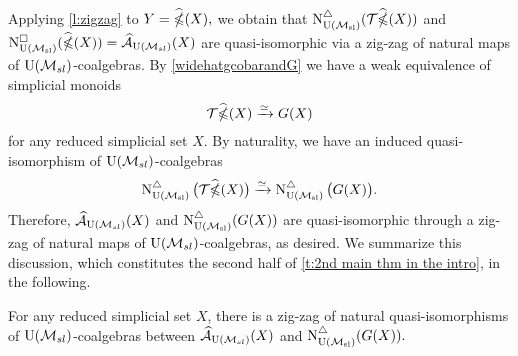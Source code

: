 	Applying \cref{l:zigzag} to $Y= \widehat{\ccobar}(X),$ we obtain that $\schainsUSL (\mathcal{T} \widehat{\ccobar}(X))$ and $\cchainsUSL(\widehat{\ccobar}(X)) = \Ahat_{\USL}(X)$ are quasi-isomorphic via a zig-zag of natural maps of $\USL$-coalgebras.
	By \cref{widehatgcobarandG} we have a weak equivalence of simplicial monoids
	\begin{equation*}
	\mathcal{T}\widehat{\ccobar}(X) \xrightarrow{\simeq} G(X)
	\end{equation*}
	for any reduced simplicial set $X$.
	By naturality, we have an induced quasi-isomorphism of $\USL$-coalgebras
	\begin{equation*}
	\schainsUSL \big( \mathcal{T}\widehat{\ccobar}(X) \big) \xra{\simeq}
	\schainsUSL \big( G(X) \big).
	\end{equation*}
	Therefore, $\Ahat_{\USL}(X)$ and $\schainsUSL(G(X))$ are quasi-isomorphic through a zig-zag of natural maps of $\USL$-coalgebras, as desired.
We summarize this discussion, which constitutes the second half of \cref{t:2nd main thm in the intro}, in the following.
\begin{lemma}
For any reduced simplicial set $X$, there is a zig-zag of natural quasi-isomorphisms of $\USL$-coalgebras between $\Ahat_\USL(X)$ and $\schainsUSL(G(X)).$
\end{lemma}